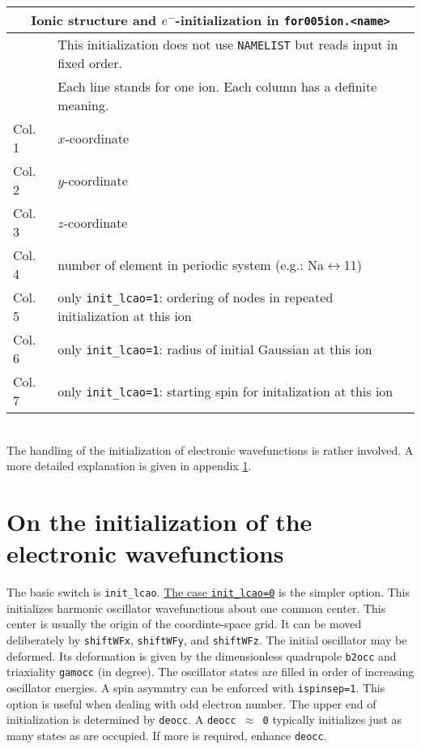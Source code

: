 \documentclass[12pt]{article}
\begin{document}
\begin{enumerate}
\begin{tabular}{ll}
\hline
\multicolumn{2}{c}{Ionic structure and $e^-$-initialization in {\tt for005ion.<name>}} \\
\hline
& This initialization does not use {\tt NAMELIST} but reads
 input in fixed order.\\
& Each line stands for one ion. Each column has a definite meaning.\\
Col. 1 &  $x$-coordinate \\
Col. 2 &  $y$-coordinate \\
Col. 3 &  $z$-coordinate \\
Col. 4 & 
   number of element in periodic system (e.g.: Na$\leftrightarrow$11)\\
Col. 5 & only {\tt init\_lcao=1}: ordering of nodes in repeated
    initialization at this ion\\
Col. 6 & only {\tt init\_lcao=1}: radius of initial Gaussian at 
    this ion\\
Col. 7 & only {\tt init\_lcao=1}: starting spin for initalization at
    this ion\\
\hline
\end{tabular}
\\[8pt]
The handling of the initialization of electronic wavefunctions is
rather involved. A more detailed explanation is given in appendix
\ref{sec:inite}.

\newpage

\appendix

\section{On the initialization of the electronic wavefunctions}
\label{sec:inite}

The basic switch is {\tt init\_lcao}. \underline{The case
{\tt init\_lcao=0}} is the simpler option. This initializes harmonic
oscillator wavefunctions about one common center. This center is
usually the origin of the coordinte-space grid. It can be moved
deliberately by {\tt shiftWFx}, {\tt shiftWFy}, and {\tt shiftWFz}.
The initial oscillator may be deformed. Its deformation is given by
the dimensionless quadrupole {\tt b2occ} and triaxiality {\tt gamocc}
(in degree). The oscillator states are filled in order of
increasing oscillator energies. A spin asymmtry can be enforced
with {\tt ispinsep=1}. This option is useful when dealing with odd
electron number. The upper end of initialization is determined by
{\tt deocc}. A {\tt deocc $\approx$ 0} typically initializes just as many
states as are occupied. If more is required, enhance {\tt deocc}.


\end{enumerate}
\end{document}
